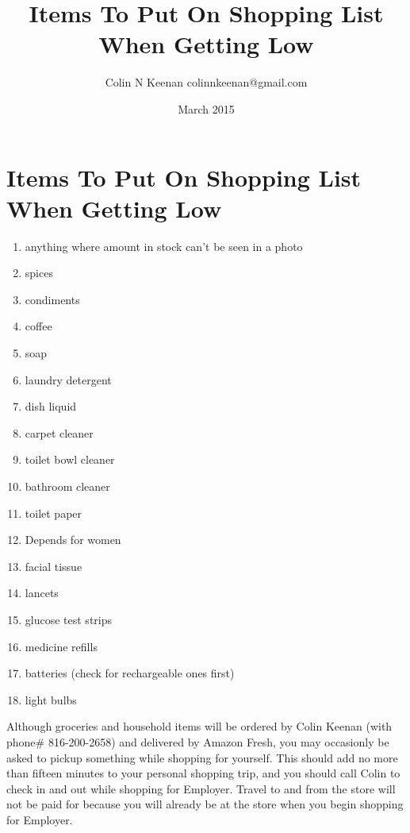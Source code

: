 \documentclass[12pt,letterpaper]{article}
\newcommand{\mytitle}{Items To Put On Shopping List When Getting Low}
\begin{document}
\title{\mytitle{}}
\author{Colin N Keenan colinnkeenan@gmail.com}
\date{March 2015}
\section*{\mytitle{}}
\begin{enumerate}
	\item anything where amount in stock can't be seen in a photo
	\item spices
	\item condiments
	\item coffee
	\item soap
	\item laundry detergent
	\item dish liquid
	\item carpet cleaner
	\item toilet bowl cleaner
	\item bathroom cleaner
	\item toilet paper
	\item Depends for women
	\item facial tissue
	\item lancets
	\item glucose test strips
	\item medicine refills
	\item batteries (check for rechargeable ones first)
	\item light bulbs
\end{enumerate}
Although groceries and household items will be ordered by Colin Keenan (with phone\# 816-200-2658) and delivered by Amazon Fresh, you may occasionly be asked to pickup something while shopping for yourself. This should add no more than fifteen minutes to your personal shopping trip, and you should call Colin to check in and out while shopping for Employer. Travel to and from the store will not be paid for because you will already be at the store when you begin shopping for Employer. 
\end{document}
